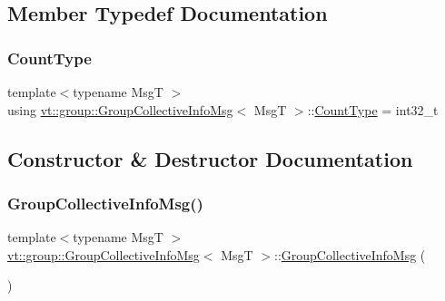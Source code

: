 \subsection{Member Typedef Documentation}
\mbox{\label{structvt_1_1group_1_1_group_collective_info_msg_a3d20316314d3cc3ac13ff4c5250203a5}} 
\subsubsection{\texorpdfstring{Count\+Type}{CountType}}
{\footnotesize\ttfamily template$<$typename MsgT $>$ \\
using \hyperlink{structvt_1_1group_1_1_group_collective_info_msg}{vt\+::group\+::\+Group\+Collective\+Info\+Msg}$<$ MsgT $>$\+::\hyperlink{structvt_1_1group_1_1_group_collective_info_msg_a3d20316314d3cc3ac13ff4c5250203a5}{Count\+Type} =  int32\+\_\+t}



\subsection{Constructor \& Destructor Documentation}
\mbox{\label{structvt_1_1group_1_1_group_collective_info_msg_a92fdcd49062ed34fdb873b10e33e06f1}} 
\subsubsection{\texorpdfstring{Group\+Collective\+Info\+Msg()}{GroupCollectiveInfoMsg()}\hspace{0.1cm}{\footnotesize\ttfamily [1/2]}}
{\footnotesize\ttfamily template$<$typename MsgT $>$ \\
\hyperlink{structvt_1_1group_1_1_group_collective_info_msg}{vt\+::group\+::\+Group\+Collective\+Info\+Msg}$<$ MsgT $>$\+::\hyperlink{structvt_1_1group_1_1_group_collective_info_msg}{Group\+Collective\+Info\+Msg} (\begin{DoxyParamCaption}{ }\end{DoxyParamCaption})\hspace{0.3cm}{\ttfamily [default]}}

